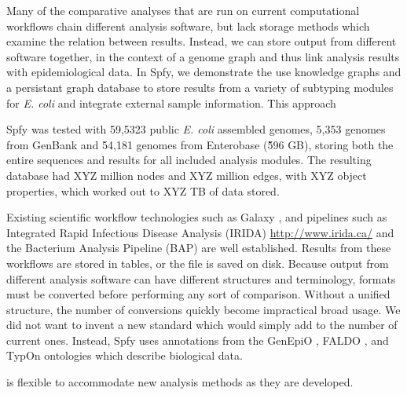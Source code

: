 Many of the comparative analyses that are run on current computational workflows chain different analysis software, but lack storage methods which examine the relation between results.
Instead, we can store output from different software together, in the context of a genome graph and thus link analysis results with epidemiological data.
In Spfy, we demonstrate the use knowledge graphs and a persistant graph database to store results from a variety of subtyping modules for \textit{E. coli} and integrate external sample information.
This approach 

Spfy was tested with 59,5323 public \textit{E. coli} assembled genomes, 5,353 genomes from GenBank and 54,181 genomes from Enterobase (\~596 GB), storing both the entire sequences and results for all included analysis modules.
The resulting database had XYZ million nodes and XYZ million edges, with XYZ object properties, which worked out to XYZ TB of data stored.


Existing scientific workflow technologies such as Galaxy \citep{goecks2010galaxy}, and pipelines such as Integrated Rapid Infectious Disease Analysis (IRIDA) \url{http://www.irida.ca/} and the Bacterium Analysis Pipeline (BAP) \citep{thomsen2016bacterial} are well established.
Results from these workflows are stored in tables, or the file is saved on disk.
Because output from different analysis software can have different structures and terminology, formats must be converted before performing any sort of comparison.
Without a unified structure, the number of conversions quickly become impractical broad usage.
We did not want to invent a new standard which would simply add to the number of current ones.
Instead, Spfy uses annotations from the GenEpiO \citep{griffiths2017context}, FALDO \citep{bolleman2016faldo}, and TypOn \citep{vaz2014typon} ontologies which describe biological data.

is flexible to accommodate new analysis methods as they are developed.




